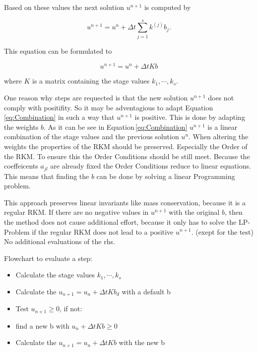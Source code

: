 \documentclass{article}
\begin{document}
Based on these values the next solution $u^{n+1}$ is computed by

\begin{equation}
u^{n+1} = u^n + \Delta t \sum_{j  = 1}^s k^{(j)} b_j .
\end{equation}

This equation can be formulated to

\begin{equation}\label{eq:Combination}
u^{n+1} = u^n + \Delta t K b
\end{equation}

where $K$ is a matrix containing the stage values $k_1,\cdots,k_s$.

One reason why steps are requected is that the new solution $u^{n+1}$ does not comply with positifity. 
So it may be adventagious to adapt Equation\,\ref{eq:Combination} in such a way that $u^{n+1}$ is positive. This is done by adapting the weights $b$.
As it can be see in Equation\,\ref{eq:Combination} $u^{n+1}$ is a linear combination of the stage values and the previous solution $u^n$.
When altering the weights the properties of the RKM should be preserved. Especially the Order of the RKM.  
To ensure this the Order Conditions should be still meet. 
Because the coeffeicents $a_{jl}$ are already fixed the Order Conditions reduce to linear equations.
This means that finding the $b$ can be done by solving a linear Programming problem.
 
This approach preserves linear invariants like mass conservation, because it is a regular RKM. 
If there are no negative values in $u^{n+1}$ with the original $b$, then the method does not cause additional effort, because it only has to solve the LP-Problem if the regular RKM does not lead to a positive $u^{n+1}$. (exept for the test)
No additional evaluations of the rhs.

Flowchart to evaluate a step:

\begin{itemize}
\item Calculate the stage values $k_1,\cdots,k_s$
\item Calculate the $u_{n+1} = u_n + \Delta t K b_{d}$ with a default b
\item Test $u_{n+1} \geq 0$, if not:
\item find a new b with $u_n + \Delta t K b \geq 0$
\item Calculate the $u_{n+1} = u_n + \Delta t K b$ with the new b
\end{itemize}
\end{document}
